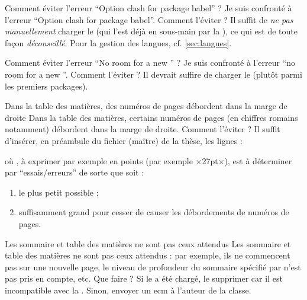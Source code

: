 \begin{dbfaq}{Comment éviter l'erreur \enquote{Option clash for package babel} ?}{}
  Je suis confronté à l'erreur \enquote{Option clash for package
    babel}. Comment l'éviter ?
  \tcblower
  Il suffit de \emph{ne pas manuellement} charger le  (qui l'est
  déjà en sous-main par la \yatcl{}), ce qui est de toute façon
  \emph{déconseillé}. Pour la gestion des langues, cf. \vref{sec:langues}.
\end{dbfaq}

\begin{dbfaq}{Comment éviter l'erreur \enquote{No room for a new
      \protect{}} ?}{}
  Je suis confronté à l'erreur \enquote{no room for a new
    }. Comment l'éviter ?
  \tcblower
  Il devrait suffire de charger le  (plutôt parmi les
  premiers packages).
\end{dbfaq}

\begin{dbfaq}{Dans la table des matières, des numéros de pages débordent dans
    la marge de droite}{}
  Dans la table des matières, certains numéros de pages (en chiffres romains
  notamment) débordent dans la marge de droite. Comment l'éviter ?
  \tcblower
  Il suffit d'insérer, en préambule du fichier (maître) de la thèse, les
  lignes :
\begin{preamblecode}
\makeatletter
\renewcommand*\@pnumwidth{÷\meta{distance}÷}
\makeatother
\end{preamblecode}
où , à exprimer par exemple en points (par exemple ×27pt×), est
à déterminer par \enquote{essais/erreurs} de sorte que  soit :
\begin{enumerate}
\item le plus petit possible ;
\item suffisamment grand pour cesser de causer les débordements de numéros de
  pages.
\end{enumerate}
\end{dbfaq}

\begin{dbfaq}{Les sommaire et table des matières ne sont pas ceux attendus}{}
  Les sommaire et table des matières ne sont pas ceux attendus : par exemple,
  ils ne commencent pas sur une nouvelle page, le niveau de profondeur du
  sommaire spécifié par  n'est pas pris en compte, etc. Que faire ?
  \tcblower
  Si le  a été chargé, le supprimer car il est incompatible
  avec la \yatcl{}. Sinon, envoyer un \gls{ecm} à l'auteur de la classe.
\end{dbfaq}


%
\iffalse
\fi
